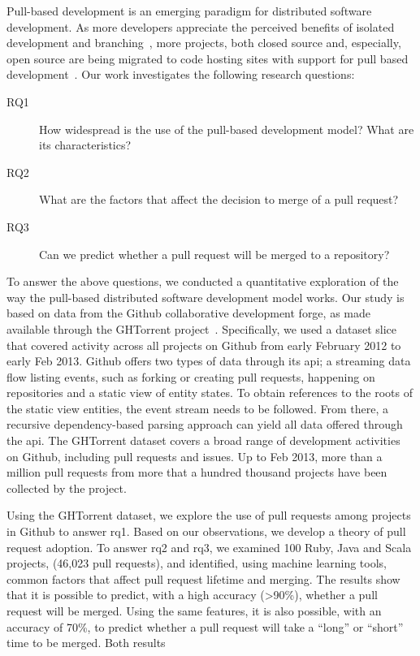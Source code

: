 \documentclass{sig-alternate}
\begin{document}
Pull-based development is an emerging paradigm for distributed software
development. As more developers appreciate the perceived benefits of isolated
development and branching~\cite{Bird12}, more projects, both closed source and,
especially, open source are being migrated to code hosting sites with support
for pull based development~\cite{Barr12}. Our work investigates the following
research questions:

\begin{description}
  
  \item[RQ1] How widespread is the use of the pull-based development model? What
    are its characteristics?
  
  \item[RQ2] What are the factors that affect the decision to merge of a pull request?

  \item[RQ3] Can we predict whether a pull request will be merged to a
    repository?

\end{description}

To answer the above questions, we conducted a quantitative exploration of the
way the pull-based distributed software development model works.
Our study is based on data from the Github
collaborative development forge, as made available through the GHTorrent
project~\cite{GS12}. Specifically, we used a dataset slice that covered activity
across all projects on Github from early February 2012 to early Feb 2013.
Github offers two types of data through its {\sc api}; a streaming data flow
listing events, such as forking or creating pull requests, happening on
repositories and a static view of entity states. To obtain references to the
roots of the static view entities, the event stream needs to be followed. From
there, a recursive dependency-based parsing approach can yield all data
offered through the {\sc api}. 
The GHTorrent dataset covers a broad range of development activities on Github,
including pull requests and issues. Up to Feb 2013, more than a million 
pull requests from more that a hundred thousand projects have been collected by the project.

Using the GHTorrent dataset, we explore the use of pull requests among projects
in Github to answer {\sc rq1}. Based on our observations, we develop a theory
of pull request adoption.
To answer {\sc rq2} and {\sc rq3}, we examined 100 Ruby, Java and Scala projects,
(46,023 pull requests), and identified, using machine
learning tools, common factors that affect pull request lifetime and merging.
The results show that it is
possible to predict, with a high accuracy (>90\%), whether a pull request will be
merged. Using the same features, it is also possible, with an accuracy of 70\%, to predict whether a pull request will take a ``long'' or ``short'' time to
be merged. Both results 
\end{document}
